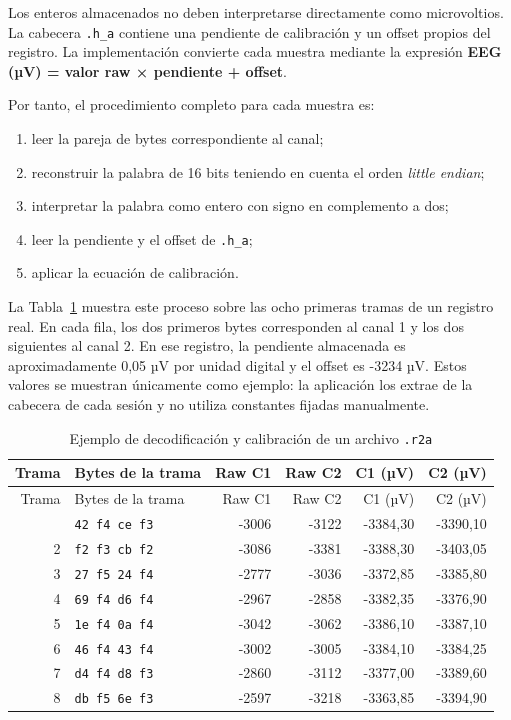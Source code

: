 \documentclass[
  spanish,
  a4paper,
  12pt,
  twoside]{memoir}
\providecommand{\tightlist}{%
  \setlength{\itemsep}{0pt}\setlength{\parskip}{0pt}}
\begin{document}
Los enteros almacenados no deben interpretarse directamente como
microvoltios. La cabecera \texttt{.h\_a} contiene una pendiente de
calibración y un offset propios del registro. La implementación
convierte cada muestra mediante la expresión \textbf{EEG (µV) = valor
raw × pendiente + offset}.

Por tanto, el procedimiento completo para cada muestra es:

\begin{enumerate}
\def\labelenumi{\arabic{enumi}.}
\tightlist
\item
  leer la pareja de bytes correspondiente al canal;
\item
  reconstruir la palabra de 16 bits teniendo en cuenta el orden
  \emph{little endian};
\item
  interpretar la palabra como entero con signo en complemento a dos;
\item
  leer la pendiente y el offset de \texttt{.h\_a};
\item
  aplicar la ecuación de calibración.
\end{enumerate}

La Tabla~\ref{tbl-decodificacion-r2a} muestra este proceso sobre las
ocho primeras tramas de un registro real. En cada fila, los dos primeros
bytes corresponden al canal 1 y los dos siguientes al canal 2. En ese
registro, la pendiente almacenada es aproximadamente 0,05 µV por unidad
digital y el offset es -3234 µV. Estos valores se muestran únicamente
como ejemplo: la aplicación los extrae de la cabecera de cada sesión y
no utiliza constantes fijadas manualmente.

\begin{longtable}[]{@{}rlrrrr@{}}
\caption{Ejemplo de decodificación y calibración de un archivo
\protect\texttt{.r2a}}\label{tbl-decodificacion-r2a}\tabularnewline
\toprule\noalign{}
Trama & Bytes de la trama & Raw C1 & Raw C2 & C1 (µV) & C2 (µV) \\
\midrule\noalign{}
\endfirsthead
\toprule\noalign{}
Trama & Bytes de la trama & Raw C1 & Raw C2 & C1 (µV) & C2 (µV) \\
\midrule\noalign{}
\endhead
\bottomrule\noalign{}
\endlastfoot
1 & \texttt{42\ f4\ ce\ f3} & -3006 & -3122 & -3384,30 & -3390,10 \\
2 & \texttt{f2\ f3\ cb\ f2} & -3086 & -3381 & -3388,30 & -3403,05 \\
3 & \texttt{27\ f5\ 24\ f4} & -2777 & -3036 & -3372,85 & -3385,80 \\
4 & \texttt{69\ f4\ d6\ f4} & -2967 & -2858 & -3382,35 & -3376,90 \\
5 & \texttt{1e\ f4\ 0a\ f4} & -3042 & -3062 & -3386,10 & -3387,10 \\
6 & \texttt{46\ f4\ 43\ f4} & -3002 & -3005 & -3384,10 & -3384,25 \\
7 & \texttt{d4\ f4\ d8\ f3} & -2860 & -3112 & -3377,00 & -3389,60 \\
8 & \texttt{db\ f5\ 6e\ f3} & -2597 & -3218 & -3363,85 & -3394,90 \\
\end{longtable}
\end{document}
